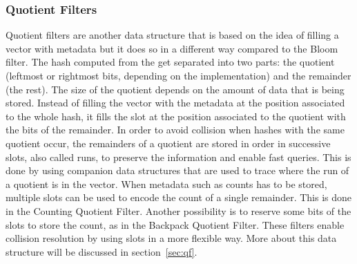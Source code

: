 \subsubsection{Quotient Filters}
Quotient filters are another data structure that is based on the idea of filling a vector with metadata but it does so in a different way compared to the Bloom filter.
The hash computed from the \kmer get separated into two parts: the quotient (leftmost or rightmost bits, depending on the implementation) and the remainder (the rest). The size of the quotient depends on the amount of data that is being stored. Instead of filling the vector with the metadata at the position associated to the whole hash, it fills the slot at the position associated to the quotient with the bits of the remainder. In order to avoid collision when hashes with the same quotient occur, the remainders of a quotient are stored in order in successive slots, also called runs, to preserve the information and enable fast queries. This is done by using companion data structures that are used to trace where the run of a quotient is in the vector. When metadata such as counts has to be stored, multiple slots can be used to encode the count of a single remainder. This is done in the Counting Quotient Filter. Another possibility is to reserve some bits of the slots to store the count, as in the Backpack Quotient Filter.
These filters enable collision resolution by using slots in a more flexible way. More about this data structure will be discussed in section~\ref{sec:qf}.

